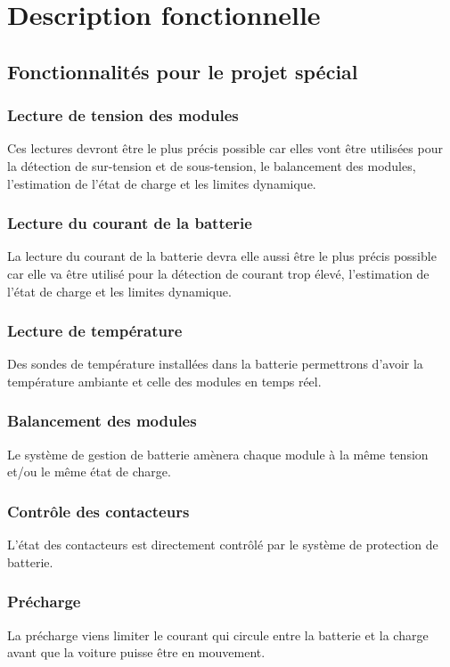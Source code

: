 
\section{Description fonctionnelle}

	\subsection{Fonctionnalités pour le projet spécial}
		\subsubsection{Lecture de tension des modules}
		Ces lectures devront être le plus précis possible car elles vont être utilisées pour la détection de sur-tension et de sous-tension, le balancement des modules, l'estimation de l'état de charge et les limites dynamique. 
		
		\subsubsection{Lecture du courant de la batterie}
		La lecture du courant de la batterie devra elle aussi être le plus précis possible car elle va être utilisé pour la détection de courant trop élevé, l'estimation de l'état de charge et les limites dynamique.
		
		\subsubsection{Lecture de température}
		Des sondes de température installées dans la batterie permettrons d'avoir la température ambiante et celle des modules en temps réel. 
		
		\subsubsection{Balancement des modules}
		Le système de gestion de batterie amènera chaque module à la même tension et/ou le même état de charge. 
		
		\subsubsection{Contrôle des contacteurs}
		L'état des contacteurs est directement contrôlé par le système de protection de batterie. 
		
		\subsubsection{Précharge}
		La précharge viens limiter le courant qui circule entre la batterie et la charge avant que la voiture puisse être en mouvement.
		

